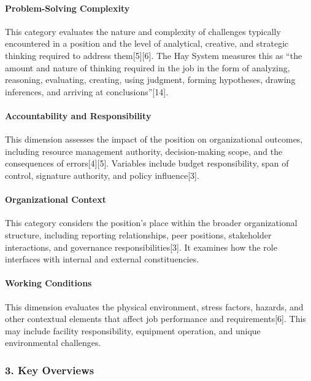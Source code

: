 \documentclass[./main.tex]{subfiles}
\begin{document}
\paragraph{Problem-Solving
Complexity}\label{problem-solving-complexity}

This category evaluates the nature and complexity of challenges
typically encountered in a position and the level of analytical,
creative, and strategic thinking required to address them{[}5{]}{[}6{]}.
The Hay System measures this as ``the amount and nature of thinking
required in the job in the form of analyzing, reasoning, evaluating,
creating, using judgment, forming hypotheses, drawing inferences, and
arriving at conclusions''{[}14{]}.

\paragraph{Accountability and
Responsibility}\label{accountability-and-responsibility}

This dimension assesses the impact of the position on organizational
outcomes, including resource management authority, decision-making
scope, and the consequences of errors{[}4{]}{[}5{]}. Variables include
budget responsibility, span of control, signature authority, and policy
influence{[}3{]}.

\paragraph{Organizational Context}\label{organizational-context}

This category considers the position's place within the broader
organizational structure, including reporting relationships, peer
positions, stakeholder interactions, and governance
responsibilities{[}3{]}. It examines how the role interfaces with
internal and external constituencies.

\paragraph{Working Conditions}\label{working-conditions}

This dimension evaluates the physical environment, stress factors,
hazards, and other contextual elements that affect job performance and
requirements{[}6{]}. This may include facility responsibility, equipment
operation, and unique environmental challenges.

\subsubsection{3. Key Overviews}\label{key-overviews}
\end{document}
